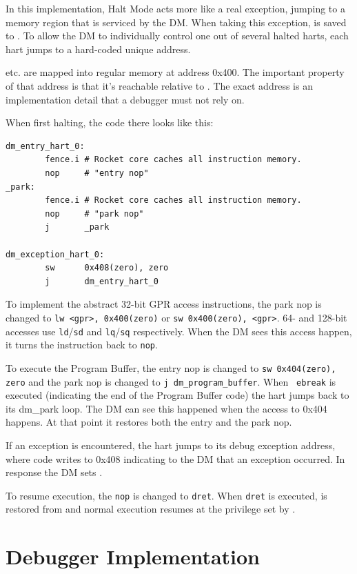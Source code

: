 \documentclass{article}
\begin{document}
In this implementation, Halt Mode acts more like a real exception, jumping to a
memory region that is serviced by the DM. When taking this exception, \Rpc is
saved to \Rdpc. To allow the DM to individually control one out of several
halted harts, each hart jumps to a hard-coded unique address.

\Rdatazero etc. are mapped into regular memory at address 0x400. The important
property of that address is that it's reachable relative to \Rzero. The exact
address is an implementation detail that a debugger must not rely on.

When first halting, the code there looks like this:
\begin{verbatim}
dm_entry_hart_0:
        fence.i # Rocket core caches all instruction memory.
        nop     # "entry nop"
_park:
        fence.i # Rocket core caches all instruction memory.
        nop     # "park nop"
        j       _park

dm_exception_hart_0:
        sw      0x408(zero), zero
        j       dm_entry_hart_0
\end{verbatim}

To implement the abstract 32-bit GPR access instructions, the park nop is
changed to {\tt lw <gpr>, 0x400(zero)} or {\tt sw 0x400(zero), <gpr>}. 64- and
128-bit accesses use {\tt ld}/{\tt sd} and {\tt lq}/{\tt sq} respectively. When
the DM sees this access happen, it turns the instruction back to {\tt nop}.

To execute the Program Buffer, the entry nop is changed to {\tt sw 0x404(zero),
zero} and the park nop is changed to {\tt j dm\_program\_buffer}. When {\tt
ebreak} is executed (indicating the end of the Program Buffer code) the hart
jumps back to its dm\_park loop. The DM can see this happened when the access
to 0x404 happens. At that point it restores both the entry and the park nop.

If an exception is encountered, the hart jumps to its debug exception address,
where code writes to 0x408 indicating to the DM that an exception occurred. In
response the DM sets \Fcmderr.

To resume execution, the {\tt nop} is changed to {\tt dret}.  When {\tt dret}
is executed, \Rpc is restored from \Rdpc and normal execution resumes at the
privilege set by \Fprv.

\section{Debugger Implementation}
\end{document}
